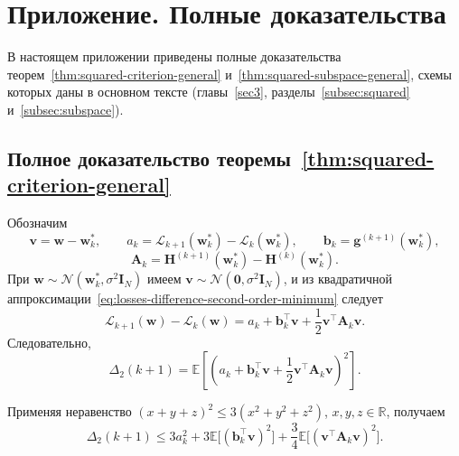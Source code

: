 \cleardoublepage
{}
{}
\section*{Приложение. Полные доказательства}\label{append}

В настоящем приложении приведены полные доказательства теорем~\ref{thm:squared-criterion-general} и~\ref{thm:squared-subspace-general}, схемы которых даны в основном тексте (главы~\ref{sec3}, разделы~\ref{subsec:squared} и~\ref{subsec:subspace}).

\subsection*{Полное доказательство теоремы~\ref{thm:squared-criterion-general}}\label{app:proof-squared}

Обозначим
\begin{equation}
    \mathbf v = \mathbf w-\mathbf w_k^*,
    \qquad
    a_k = \mathcal L_{k+1}(\mathbf w_k^*)-\mathcal L_k(\mathbf w_k^*),
    \qquad
    \mathbf b_k = \mathbf g^{(k+1)}(\mathbf w_k^*),
\end{equation}
\begin{equation}
    \mathbf A_k = \mathbf H^{(k+1)}(\mathbf w_k^*) - \mathbf H^{(k)}(\mathbf w_k^*).
\end{equation}
При $\mathbf w \sim \mathcal N(\mathbf w_k^*, \sigma^2 \mathbf I_N)$ имеем $\mathbf v \sim \mathcal N(\mathbf 0, \sigma^2 \mathbf I_N)$, и из квадратичной аппроксимации~\eqref{eq:losses-difference-second-order-minimum} следует
\begin{equation}
    \label{eq:app-squared-step1}
    \mathcal L_{k+1}(\mathbf w)-\mathcal L_k(\mathbf w)
    =
    a_k+\mathbf b_k^\top \mathbf v+\frac12 \mathbf v^\top \mathbf A_k \mathbf v.
\end{equation}
Следовательно,
\begin{equation}
    \label{eq:app-squared-step2}
    \Delta_2(k+1)
    =
    \mathbb E
    \left[
        \left(
            a_k+\mathbf b_k^\top \mathbf v+\frac12 \mathbf v^\top \mathbf A_k \mathbf v
        \right)^2
    \right].
\end{equation}

Применяя неравенство $(x+y+z)^2 \leqslant 3(x^2+y^2+z^2)$, $x,y,z \in \mathbb R$, получаем
\begin{equation}
    \label{eq:app-squared-step3}
    \Delta_2(k+1)
    \leqslant
    3a_k^2
    +
    3\mathbb E\big[(\mathbf b_k^\top \mathbf v)^2\big]
    +
    \frac{3}{4}\mathbb E\big[(\mathbf v^\top \mathbf A_k \mathbf v)^2\big].
\end{equation}

